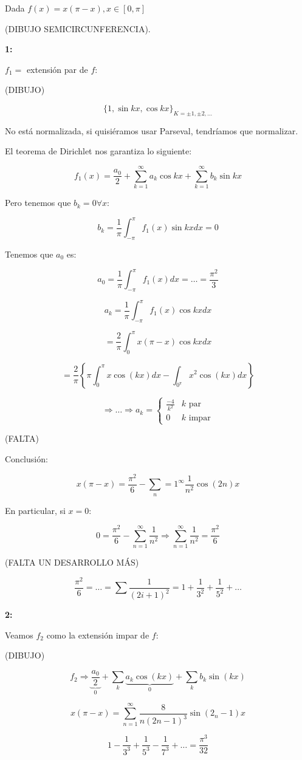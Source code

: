 	\begin{example}

		Dada $f(x) = x(\pi-x), x \in [0,\pi]$

		(DIBUJO SEMICIRCUNFERENCIA).

		\textbf{1:}

		$f_1 = $ extensión par de $f$:

		(DIBUJO)

		\[\{ 1, \sin{kx}, \cos{kx} \}_{K = ±1,±2,…} \]

		\obs No está normalizada, si quisiéramos usar Parseval, tendríamos que normalizar.

		El teorema de Dirichlet nos garantiza lo siguiente:

		\[
			f_1(x) = \frac{a_0}{2} + \sum_{k=1}^\infty a_k \cos{kx} + \sum_{k=1}^\infty b_k \sin kx
		\]

		Pero tenemos que $b_k = 0 \forall x$:

		\[b_k = \frac{1}{\pi} \int_{-\pi}^{\pi} f_1(x) \sin kx dx = 0 \]

		Tenemos que $a_0$ es:

		\[ a_0 = \frac{1}{\pi} \int_{-\pi}^{\pi} f_1(x) dx = … = \frac{\pi^2}{3} \]

		\[ a_k = \frac{1}{\pi} \int_{-\pi}^{\pi} f_1(x) \cos kx dx\]

		\[ = \frac{2}{\pi} \int_{0}^{\pi} x(\pi - x) \cos kx dx\]

		\[ = \frac{2}{\pi} \left\{ \pi \int_{0}^{\pi} x \cos(kx) dx  - \int_{0^π} x^2 \cos(kx) dx \right\}  \]

		\[ \Rightarrow … \Rightarrow a_k = \begin{cases}
			\frac{-4}{k^2} & k \text{ par} \\
			0 & k \text{ impar}
		\end{cases}  \]

		(FALTA)

		Conclusión:

		\[ x(\pi - x) = \frac{\pi^2}{6} -\sum_n=1^\infty \frac{1}{n^2} \cos(2n) x \]

		En particular, si $x=0$:

		\[ 0 = \frac{π^2}{6}  - \sum_{n=1}^\infty \frac{1}{n^2} \Rightarrow  \sum_{n=1}^\infty \frac{1}{n^2} = \frac{\pi^2}{6} \]

		(FALTA UN DESARROLLO MÁS) %

		\[ \frac{\pi^2}{6} = … = \sum \frac{1}{(2i +1)^2}= 1 + \frac{1}{3^2} + \frac{1}{5^2} + … \]

		\textbf{2:}

		Veamos $f_2$ como la extensión impar de $f$:

		(DIBUJO)

		\[ f_2 \Rightarrow \underbrace{\frac{a_0}{2}}_{0} + \sum_k \underbrace{a_k \cos(kx)}_{0} + \sum_k b_k \sin(kx)  \]

		\[  x(\pi - x) = \sum_{n=1}^{\infty} \frac{8}{n(2n-1)^3} \sin(2_n-1)x  \]

		\[  1 - \frac{1}{3^3} + \frac{1}{5^3} - \frac{1}{7^3} + … = \frac{\pi^3}{32}\]


	\end{example}









